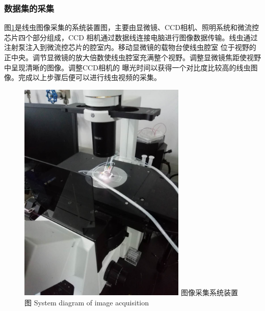 \subsubsection{数据集的采集}
	图\ref{fig:chap5:camera}是线虫图像采集的系统装置图，主要由显微镜、CCD相机、照明系统和微流控芯片四个部分组成，CCD
	相机通过数据线连接电脑进行图像数据传输。线虫通过注射泵注入到微流控芯片的腔室内。移动显微镜的载物台使线虫腔室
	位于视野的正中央。调节显微镜的放大倍数使线虫腔室充满整个视野。调整显微镜焦距使视野中呈现清晰的图像。调整CCD相机的
	曝光时间以获得一个对比度比较高的线虫图像。完成以上步骤后便可以进行线虫视频的采集。
	\begin{figure}[thb]
	  \centering
	  \includegraphics[width=8cm]{figure/chap5/camera.jpg}
	  \bicaption
		{图像采集系统装置图}
		{System diagram of image acquisition}
	  \label{fig:chap5:camera}
	\end{figure}
